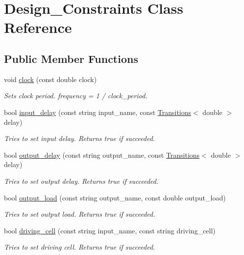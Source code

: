 \hypertarget{classDesign__Constraints}{\section{Design\-\_\-\-Constraints Class Reference}
\label{classDesign__Constraints}
}
\subsection*{Public Member Functions}
\begin{DoxyCompactItemize}
\item 
void \hyperlink{classDesign__Constraints_a3d8381f421422cdaa12e78216a3b46a8}{clock} (const double clock)
\begin{DoxyCompactList}\small\item\em Sets clock period. frequency = 1 / clock\-\_\-period. \end{DoxyCompactList}\item 
bool \hyperlink{classDesign__Constraints_ab9e466f0f2ad7cfd16f8fe0d0b814b16}{input\-\_\-delay} (const string input\-\_\-name, const \hyperlink{classTransitions}{Transitions}$<$ double $>$ delay)
\begin{DoxyCompactList}\small\item\em Tries to set input delay. Returns true if succeeded. \end{DoxyCompactList}\item 
bool \hyperlink{classDesign__Constraints_a295b66d558e3aefea0b2d2629752517d}{output\-\_\-delay} (const string output\-\_\-name, const \hyperlink{classTransitions}{Transitions}$<$ double $>$ delay)
\begin{DoxyCompactList}\small\item\em Tries to set output delay. Returns true if succeeded. \end{DoxyCompactList}\item 
bool \hyperlink{classDesign__Constraints_a3a670a53112e18db745a6f3de9597cd3}{output\-\_\-load} (const string output\-\_\-name, const double output\-\_\-load)
\begin{DoxyCompactList}\small\item\em Tries to set output load. Returns true if succeeded. \end{DoxyCompactList}\item 
bool \hyperlink{classDesign__Constraints_a54c18f5ebd9dbcdc9d3ab8f2d363fc04}{driving\-\_\-cell} (const string input\-\_\-name, const string driving\-\_\-cell)
\begin{DoxyCompactList}\small\item\em Tries to set driving cell. Returns true if succeeded. \end{DoxyCompactList}\item 

\end{DoxyCompactItemize}
